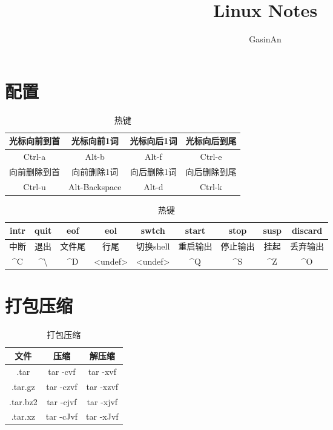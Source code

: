 \documentclass[12pt]{ctexart}
\title{Linux Notes}
\author{GasinAn}
\theoremstyle{definition}
\begin{document}
    \maketitle

    \tableofcontents

    \section{配置}

    \begin{table}[htbp]
        \centering
        \begin{tabular}{|c|c|c|c|}
            \hline
            光标向前到首 & 光标向前1词 & 光标向后1词 & 光标向后到尾 \\
            \hline
            Ctrl-a & Alt-b & Alt-f & Ctrl-e\\
            \hline
            向前删除到首 & 向前删除1词 & 向后删除1词 & 向后删除到尾 \\
            \hline
            Ctrl-u & Alt-Backspace & Alt-d & Ctrl-k\\
            \hline
        \end{tabular}
        \caption{热键}
    \end{table}

    \begin{table}[htbp]
        \centering
        \begin{tabular}{|c|c|c|c|c|c|c|c|c|}
            \hline
            intr & quit & eof & eol & swtch & start & stop & susp & discard \\
            \hline
            中断 & 退出 & 文件尾 & 行尾 & 切换shell & 重启输出 & 停止输出 & 挂起 & 丢弃输出 \\
            \hline
            \^{}C & \^{}\textbackslash & \^{}D & <undef> & <undef> & \^{}Q & \^{}S & \^{}Z & \^{}O \\
            \hline
        \end{tabular}
        \caption{热键}
    \end{table}

    \section{打包压缩}

    \begin{table}[htbp]
        \centering
        \begin{tabular}{|c|c|c|}
            \hline
            文件 & 压缩 & 解压缩\\
            \hline
            .tar & tar -cvf & tar -xvf\\
            \hline
            .tar.gz & tar -czvf & tar -xzvf\\
            \hline
            .tar.bz2 & tar -cjvf & tar -xjvf\\
            \hline
            .tar.xz & tar -cJvf & tar -xJvf\\
            \hline
        \end{tabular}
        \caption{打包压缩}
    \end{table}
\end{document}

